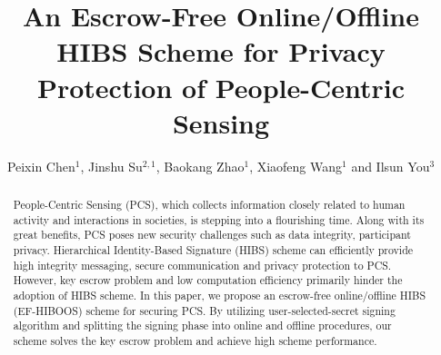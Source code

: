 \documentclass[times]{secauth}
\theoremstyle{definition}
\theoremstyle{remark}
\begin{document}


\title{An Escrow-Free Online/Offline HIBS Scheme for Privacy Protection of People-Centric Sensing}

\author{Peixin Chen$^1$, Jinshu Su$^{2, 1}$, Baokang Zhao$^1$, Xiaofeng Wang$^1$ and Ilsun You$^3$\corrauth}

\address{$^1$ College of Computer, National University of Defense Technology, Changsha 410073, China\\
$^2$ National Key Laboratory for Parallel and Distributed Processing, National University of Defense Technology, Changsha 410073, China\\
$^3$ Department of Information Security Engineering, Soonchunhyang University, Asan-si, Republic of Korea}


\begin{abstract}
People-Centric Sensing (PCS), which collects information closely related to human activity and interactions in societies, is stepping into a flourishing time. 
Along with its great benefits, PCS poses new security challenges such as data integrity, participant privacy. 
Hierarchical Identity-Based Signature (HIBS) scheme can efficiently provide high integrity messaging, secure communication and privacy protection to PCS.
However, key escrow problem and low computation efficiency primarily hinder the adoption of HIBS scheme.
In this paper, we propose an escrow-free online/offline HIBS (EF-HIBOOS) scheme for securing PCS.
By utilizing user-selected-secret signing algorithm and splitting the signing phase into online and offline procedures, our scheme solves the key escrow problem and achieve high scheme performance.
\end{abstract}


\maketitle

\end{document}
